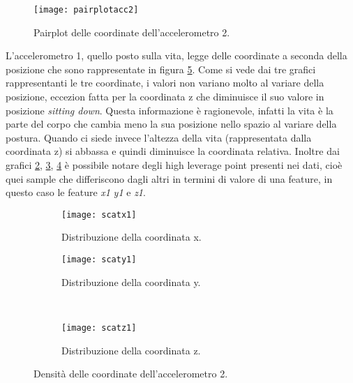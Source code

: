 \begin{figure}[h]
    \centering\texttt{[image: pairplotacc2]}
    \caption{Pairplot delle coordinate dell'accelerometro 2.}
    \label{fig:pairplot}
\end{figure}

L'accelerometro 1, quello posto sulla vita, legge delle coordinate a seconda della posizione che sono rappresentate in figura \ref{fig:scatterplot}. Come si vede dai tre grafici rappresentanti le tre coordinate, i valori non variano molto al variare della posizione, eccezion fatta per la coordinata z che diminuisce il suo valore in posizione \textit{sitting down}. Questa informazione è ragionevole, infatti la vita è la parte del corpo che cambia meno la sua posizione nello spazio al variare della postura.  Quando ci siede invece l'altezza della vita (rappresentata dalla coordinata z) si abbassa e quindi diminuisce la coordinata relativa. Inoltre dai grafici \ref{fig:scatterplot:x1}, \ref{fig:scatterplot:y1}, \ref{fig:scatterplot:z1} è possibile notare degli high leverage point presenti nei dati, cioè quei sample che differiscono dagli altri in termini di valore di una feature, in questo caso le feature \textit{x1} \textit{y1} e \textit{z1}.

\begin{figure}[h]
    \centering
    \begin{subfigure}[t]{0.4\textwidth}
        \centering\texttt{[image: scatx1]}
        \caption{Distribuzione della coordinata x.}
        \label{fig:scatterplot:x1}
    \end{subfigure}
    \begin{subfigure}[t]{0.4\textwidth}
        \centering\texttt{[image: scaty1]}
        \caption{Distribuzione della coordinata y.}
        \label{fig:scatterplot:y1}
    \end{subfigure}
    \\
    \begin{subfigure}[t]{0.4\textwidth}
        \centering\texttt{[image: scatz1]}
        \caption{Distribuzione della coordinata z.}
        \label{fig:scatterplot:z1}
    \end{subfigure}
    \caption{Densità delle coordinate dell'accelerometro 2.}
    \label{fig:scatterplot}
\end{figure}

